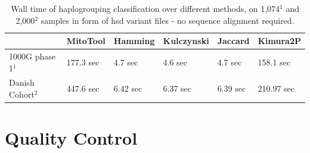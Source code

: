 \begin{table}[H]
\centering

\begin{tabular}{|l|l|l|l|l|l|}
\hline
              & MitoTool  & Hamming  & Kulczynski & Jaccard  & Kimura2P   \\ \hline
1000G phase 1$^{1}$ & 177.3 sec & 4.7 sec  & 4.6 sec    & 4.7 sec  & 158.1 sec  \\ \hline
Danish Cohort$^{2}$ & 447.6 sec & 6.42 sec & 6.37 sec   & 6.39 sec & 210.97 sec \\ \hline
\end{tabular}
\caption{Wall time of haplogrouping classification over different methods, on 1,074$^{1}$ and 2,000$^{2}$ samples in form of hsd variant files - no sequence alignment required. }
\label{table:speed}
\end{table}



\section{Quality Control}\label{hg:qc}
